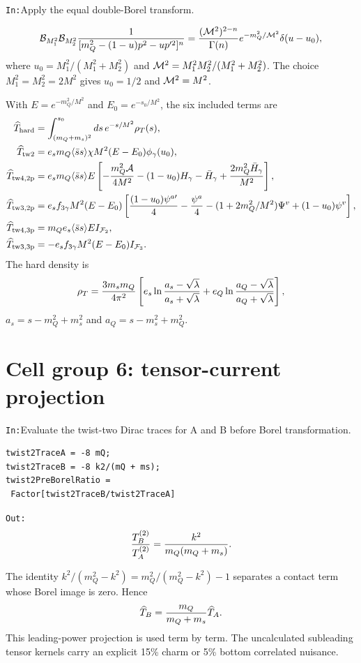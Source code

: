 \documentclass[10pt,a4paper]{article}
\newcommand{\InputCell}[1]{%
  \par\medskip\noindent\colorbox{cellblue}{%
  \parbox{\dimexpr\linewidth-2\fboxsep}{\texttt{In:}\quad #1}}\par\smallskip}
\newcommand{\OutputCell}[1]{%
  \par\smallskip\noindent\colorbox{outputgray}{%
  \parbox{\dimexpr\linewidth-2\fboxsep}{\texttt{Out:}\quad #1}}\par\medskip}
\begin{document}
\InputCell{Apply the equal double-Borel transform.}
\begin{equation}
{\cal B}_{M_1^2}{\cal B}_{M_2^2}{1\over
[m_Q^2-(1-u)p^2-up'^2]^n}
={({\cal M}^2)^{2-n}\over\Gamma(n)}
e^{-m_Q^2/{\cal M}^2}\delta(u-u_0),
\end{equation}
where $u_0=M_1^2/(M_1^2+M_2^2)$ and
${\cal M}^2=M_1^2M_2^2/(M_1^2+M_2^2)$.  The choice
$M_1^2=M_2^2=2M^2$ gives $u_0=1/2$ and ${\cal M}^2=M^2$.

With $E=e^{-m_Q^2/M^2}$ and $E_0=e^{-s_0/M^2}$, the six included terms are
\begin{align}
\widehat T_{\rm hard}&=\int_{(m_Q+m_s)^2}^{s_0}ds\,
e^{-s/M^2}\rho_T(s),\\
\widehat T_{\rm tw2}&=e_sm_Q\langle\bar ss\rangle\chi
M^2(E-E_0)\phi_\gamma(u_0),\\
\widehat T_{\rm tw4,2p}&=e_sm_Q\langle\bar ss\rangle E
\left[-{m_Q^2{\cal A}\over4M^2}-(1-u_0)H_\gamma-\bar H_\gamma
+{2m_Q^2\bar H_\gamma\over M^2}\right],\\
\widehat T_{\rm tw3,2p}&=e_sf_{3\gamma}M^2(E-E_0)
\left[{(1-u_0)\psi^{a\prime}\over4}-{\psi^a\over4}
-(1+2m_Q^2/M^2)\Psi^v+(1-u_0)\psi^v\right],\\
\widehat T_{\rm tw4,3p}&=m_Qe_s\langle\bar ss\rangle E I_{{\cal F}_2},\\
\widehat T_{\rm tw3,3p}&=-e_sf_{3\gamma}M^2(E-E_0) I_{{\cal F}_3}.
\end{align}
The hard density is
\begin{equation}
\rho_T={3m_sm_Q\over4\pi^2}\left[
e_s\ln{a_s-\sqrt\lambda\over a_s+\sqrt\lambda}
+e_Q\ln{a_Q-\sqrt\lambda\over a_Q+\sqrt\lambda}\right],
\end{equation}
$a_s=s-m_Q^2+m_s^2$ and $a_Q=s-m_s^2+m_Q^2$.

\begin{table}[H]
\centering\scriptsize
\resizebox{\textwidth}{!}{}
\caption{Numerical transition OPE ledger in $\mathrm{GeV}^4$.  The local
diagnostic is excluded.}
\end{table}

\section{Cell group 6: tensor-current projection}

\InputCell{Evaluate the twist-two Dirac traces for A and B before Borel
transformation.}
\begin{lstlisting}
twist2TraceA = -8 mQ;
twist2TraceB = -8 k2/(mQ + ms);
twist2PreBorelRatio =
 Factor[twist2TraceB/twist2TraceA]
\end{lstlisting}
\OutputCell{\[
{T_B^{(2)}\over T_A^{(2)}}={k^2\over m_Q(m_Q+m_s)}.
\]}
The identity
$k^2/(m_Q^2-k^2)=m_Q^2/(m_Q^2-k^2)-1$ separates a contact term whose Borel
image is zero.  Hence
\begin{equation}
\widehat T_B={m_Q\over m_Q+m_s}\widehat T_A.
\end{equation}
This leading-power projection is used term by term.  The uncalculated
subleading tensor kernels carry an explicit 15\% charm or 5\% bottom
correlated nuisance.
\end{document}
